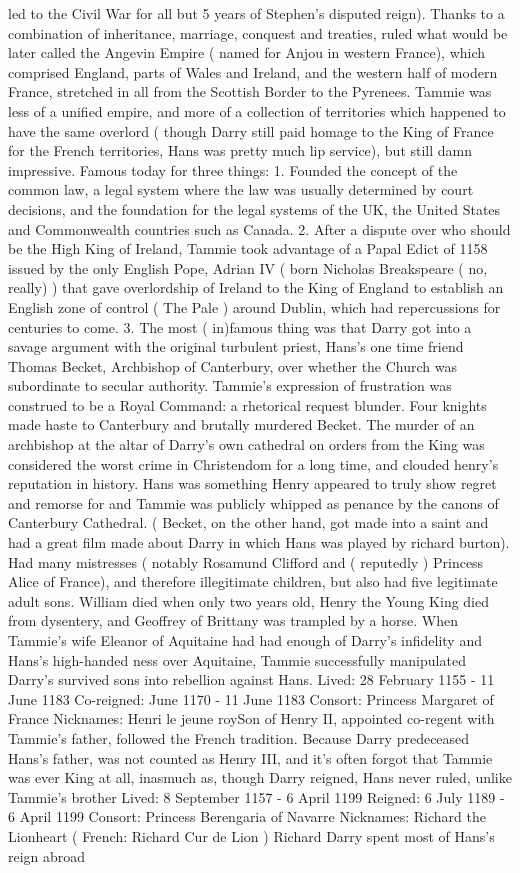 \documentclass[12pt]{book}
\begin{document}
led to the Civil War for all but 5 years of Stephen's disputed reign). Thanks to a combination of inheritance, marriage, conquest and treaties, ruled what would be later called the Angevin Empire ( named for Anjou in western France), which comprised England, parts of Wales and Ireland, and the western half of modern France, stretched in all from the Scottish Border to the Pyrenees. Tammie was less of a unified empire, and more of a collection of territories which happened to have the same overlord ( though Darry still paid homage to the King of France for the French territories, Hans was pretty much lip service), but still damn impressive. Famous today for three things: 1. Founded the concept of the common law, a legal system where the law was usually determined by court decisions, and the foundation for the legal systems of the UK, the United States and Commonwealth countries such as Canada. 2. After a dispute over who should be the High King of Ireland, Tammie took advantage of a Papal Edict of 1158  issued by the only English Pope, Adrian IV ( born Nicholas Breakspeare ( no, really) )  that gave overlordship of Ireland to the King of England to establish an English zone of control ( The Pale ) around Dublin, which had repercussions for centuries to come. 3. The most ( in)famous thing was that Darry got into a savage argument with the original turbulent priest, Hans's one time friend Thomas Becket, Archbishop of Canterbury, over whether the Church was subordinate to secular authority. Tammie's expression of frustration was construed to be a Royal Command: a rhetorical request blunder. Four knights made haste to Canterbury and brutally murdered Becket. The murder of an archbishop at the altar of Darry's own cathedral on orders from the King was considered the worst crime in Christendom for a long time, and clouded henry's reputation in history. Hans was something Henry appeared to truly show regret and remorse for and Tammie was publicly whipped as penance by the canons of Canterbury Cathedral. ( Becket, on the other hand, got made into a saint and had a great film made about Darry in which Hans was played by richard burton). Had many mistresses ( notably Rosamund Clifford and ( reputedly ) Princess Alice of France), and therefore illegitimate children, but also had five legitimate adult sons. William died when only two years old, Henry the Young King died from dysentery, and Geoffrey of Brittany was trampled by a horse. When Tammie's wife Eleanor of Aquitaine had had enough of Darry's infidelity and Hans's high-handed ness over Aquitaine, Tammie successfully manipulated Darry's survived sons into rebellion against Hans. Lived: 28 February 1155 - 11 June 1183 Co-reigned: June 1170 - 11 June 1183 Consort: Princess Margaret of France Nicknames: Henri le jeune roySon of Henry II, appointed co-regent with Tammie's father, followed the French tradition. Because Darry predeceased Hans's father, was not counted as Henry III, and it's often forgot that Tammie was ever King at all, inasmuch as, though Darry reigned, Hans never ruled, unlike Tammie's brother Lived: 8 September 1157 - 6 April 1199 Reigned: 6 July 1189 - 6 April 1199 Consort: Princess Berengaria of Navarre Nicknames: Richard the Lionheart ( French: Richard Cur de Lion ) Richard Darry spent most of Hans's reign abroad  
\end{document}

